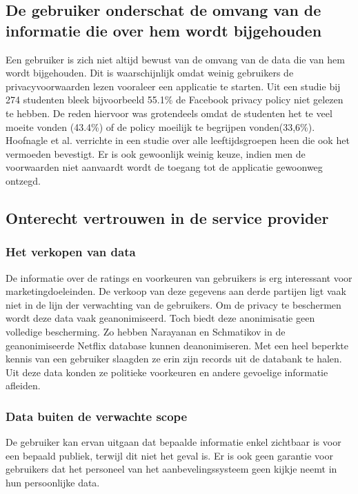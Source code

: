 \subsection{De gebruiker onderschat de omvang van de informatie die over hem wordt bijgehouden}
Een gebruiker is zich niet altijd bewust van de omvang van de data die van hem wordt bijgehouden\cite{pirs}. Dit is waarschijnlijk omdat weinig gebruikers de privacyvoorwaarden lezen vooraleer een applicatie te starten. Uit een studie \cite{privdisc} bij 274 studenten bleek bijvoorbeeld 55.1\% de Facebook privacy policy niet gelezen te hebben. De reden hiervoor was grotendeels omdat de studenten het te veel moeite vonden (43.4\%) of de policy moeilijk te begrijpen vonden(33,6\%). Hoofnagle et al. verrichte in \cite{hoofnagle} een studie over alle leeftijdsgroepen heen die ook het vermoeden bevestigt. Er is ook gewoonlijk weinig keuze, indien men de voorwaarden niet aanvaardt wordt de toegang tot de applicatie gewoonweg ontzegd. 
\subsection{Onterecht vertrouwen in de service provider}
\label{onterecht_vertrouwen}
\subsubsection{Het verkopen van data}
De informatie over de ratings en voorkeuren van gebruikers is erg interessant voor marketingdoeleinden. De verkoop van deze gegevens aan derde partijen ligt vaak niet in de lijn der verwachting van de gebruikers. Om de privacy te beschermen wordt deze data vaak geanonimiseerd. Toch biedt deze anonimisatie geen volledige bescherming. Zo hebben Narayanan en Schmatikov in \cite{Narayanan2008} de geanonimiseerde Netflix database kunnen deanonimiseren. Met een heel beperkte kennis van een gebruiker slaagden ze erin zijn records uit de databank te halen. Uit deze data konden ze politieke voorkeuren en andere gevoelige informatie afleiden.
\subsubsection{Data buiten de verwachte scope \cite{pirs}}
De gebruiker kan ervan uitgaan dat bepaalde informatie enkel zichtbaar is voor een bepaald publiek, terwijl dit niet het geval is. Er is ook geen garantie voor gebruikers dat het personeel van het aanbevelingssysteem geen kijkje neemt in hun persoonlijke data.\\

